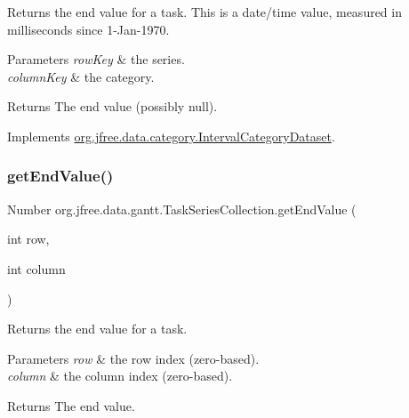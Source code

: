 Returns the end value for a task. This is a date/time value, measured in milliseconds since 1-\/\+Jan-\/1970.


\begin{DoxyParams}{Parameters}
{\em row\+Key} & the series. \\
\hline
{\em column\+Key} & the category.\\
\hline
\end{DoxyParams}
\begin{DoxyReturn}{Returns}
The end value (possibly {\ttfamily null}). 
\end{DoxyReturn}


Implements \mbox{\hyperlink{interfaceorg_1_1jfree_1_1data_1_1category_1_1_interval_category_dataset_a2801c0f15eab2373ff828698f768a4b5}{org.\+jfree.\+data.\+category.\+Interval\+Category\+Dataset}}.

\mbox{\label{classorg_1_1jfree_1_1data_1_1gantt_1_1_task_series_collection_abbfc5aad2b32ff17739295460335f57e}} 
\subsubsection{\texorpdfstring{get\+End\+Value()}{getEndValue()}\hspace{0.1cm}{\footnotesize\ttfamily [2/4]}}
{\footnotesize\ttfamily Number org.\+jfree.\+data.\+gantt.\+Task\+Series\+Collection.\+get\+End\+Value (\begin{DoxyParamCaption}\item[{int}]{row,  }\item[{int}]{column }\end{DoxyParamCaption})}

Returns the end value for a task.


\begin{DoxyParams}{Parameters}
{\em row} & the row index (zero-\/based). \\
\hline
{\em column} & the column index (zero-\/based).\\
\hline
\end{DoxyParams}
\begin{DoxyReturn}{Returns}
The end value. 
\end{DoxyReturn}


